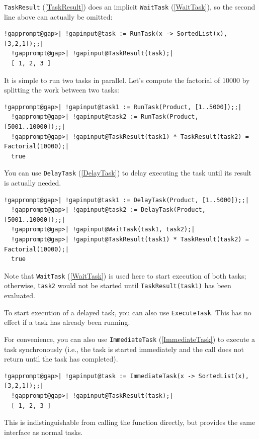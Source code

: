 \documentclass[a4paper,11pt]{report}
\begin{document}
{{ \texttt{TaskResult} (\ref{TaskResult}) does an implicit \texttt{WaitTask} (\ref{WaitTask}), so the second line above can actually be omitted: 
\begin{Verbatim}[commandchars=!@|,fontsize=\small,frame=single,label=Example]
  !gapprompt@gap>| !gapinput@task := RunTask(x -> SortedList(x), [3,2,1]);;|
  !gapprompt@gap>| !gapinput@TaskResult(task);|
  [ 1, 2, 3 ]
\end{Verbatim}
 It is simple to run two tasks in parallel. Let's compute the factorial of
10000 by splitting the work between two tasks: 
\begin{Verbatim}[commandchars=!@|,fontsize=\small,frame=single,label=Example]
  !gapprompt@gap>| !gapinput@task1 := RunTask(Product, [1..5000]);;|
  !gapprompt@gap>| !gapinput@task2 := RunTask(Product, [5001..10000]);;|
  !gapprompt@gap>| !gapinput@TaskResult(task1) * TaskResult(task2) = Factorial(10000);|
  true
\end{Verbatim}
 You can use \texttt{DelayTask} (\ref{DelayTask}) to delay executing the task until its result is actually needed. 
\begin{Verbatim}[commandchars=!@|,fontsize=\small,frame=single,label=Example]
  !gapprompt@gap>| !gapinput@task1 := DelayTask(Product, [1..5000]);;|
  !gapprompt@gap>| !gapinput@task2 := DelayTask(Product, [5001..10000]);;|
  !gapprompt@gap>| !gapinput@WaitTask(task1, task2);|
  !gapprompt@gap>| !gapinput@TaskResult(task1) * TaskResult(task2) = Factorial(10000);|
  true
\end{Verbatim}
 Note that \texttt{WaitTask} (\ref{WaitTask}) is used here to start execution of both tasks; otherwise, \texttt{task2} would not be started until \texttt{TaskResult(task1)} has been evaluated. 

 To start execution of a delayed task, you can also use \texttt{ExecuteTask}. This has no effect if a task has already been running. 

 For convenience, you can also use \texttt{ImmediateTask} (\ref{ImmediateTask}) to execute a task synchronously (i.e., the task is started immediately and the
call does not return until the task has completed). 
\begin{Verbatim}[commandchars=!@|,fontsize=\small,frame=single,label=Example]
  !gapprompt@gap>| !gapinput@task := ImmediateTask(x -> SortedList(x), [3,2,1]);;|
  !gapprompt@gap>| !gapinput@TaskResult(task);|
  [ 1, 2, 3 ]
\end{Verbatim}
 This is indistinguishable from calling the function directly, but provides the
same interface as normal tasks. 

}}
\end{document}
